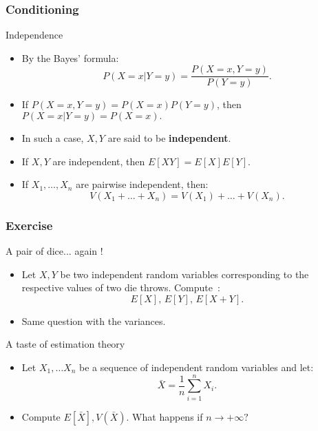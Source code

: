 \documentclass[main.tex]{subfiles}
\begin{document}
\begin{frame}
    \frametitle{Conditioning}
\begin{block}{Independence}
    \begin{itemize}
        \item<+-> By the Bayes' formula:
        \begin{equation}
            P\left( X = x \vert Y = y \right) = \frac{P\left( X = x, Y = y \right)}{P(Y=y)}.
        \end{equation}
        \item<+-> If $P\left( X = x, Y = y \right) = P\left( X = x \right)P\left( Y = y \right)$, then
        $P\left( X = x \vert Y = y \right) = P\left( X = x \right).$
        \item<+-> In such a case, $X,Y$ are said to be \textbf{independent}.
        \item<+-> If $X,Y$ are independent, then $E\left[ XY \right] = E[X]E[Y].$
        \item<+-> If $X_1, \dots, X_n$ are pairwise independent, then:
        \begin{equation}
            V\left( X_1 + \dots + X_n \right) = V\left( X_1 \right) + \dots + V\left( X_n \right).
        \end{equation}
    \end{itemize}
\end{block}
\end{frame}
\begin{frame}
    \frametitle{Exercise}
    \begin{block}{A pair of dice... again !}
        \begin{itemize}
            \item<+-> Let $X,Y$ be two independent random variables corresponding
            to the respective values of two die throws. Compute~:
            \[
            E\left[ X \right], \, E\left[ Y \right], \, E\left[ X + Y \right].
            \]
            \item<+-> Same question with the variances.
        \end{itemize}
    \end{block}
    \begin{block}{A taste of estimation theory}
        \begin{itemize}
            \item<+-> Let $X_1, \dots X_n$ be a sequence of independent random variables and
            let:
            \[
            \bar{X} = \frac{1}{n} \sum_{i=1}^n X_i.
            \]
            \item<+-> Compute $E\left[ \bar{X} \right], V\left( \bar{X} \right).$ What happens 
            if $n \to +\infty ?$
        \end{itemize}
    \end{block}    
\end{frame}
\end{document}
